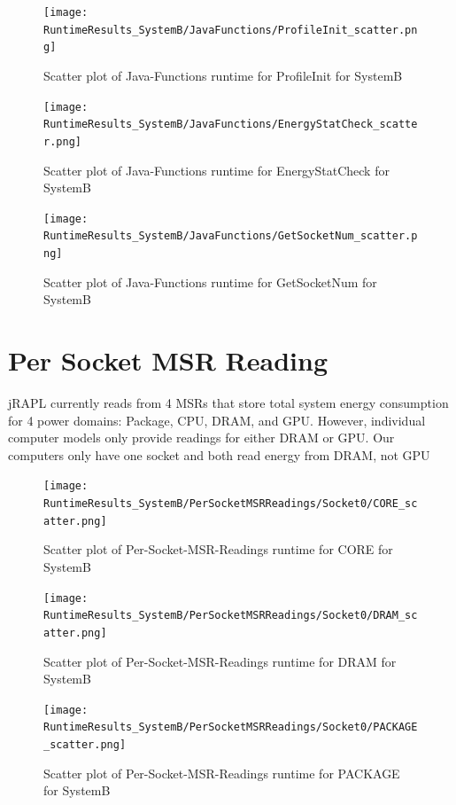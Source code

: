 \documentclass{article}
\begin{document}
\begin{figure}[H]
	\centering
	\texttt{[image: RuntimeResults\_SystemB/JavaFunctions/ProfileInit\_scatter.png]}
	\caption{Scatter plot of Java-Functions runtime for ProfileInit for SystemB}
	\label{fig:Java-Functions|ProfileInit|SystemB}
\end{figure}

\begin{figure}[H]
	\centering
	\texttt{[image: RuntimeResults\_SystemB/JavaFunctions/EnergyStatCheck\_scatter.png]}
	\caption{Scatter plot of Java-Functions runtime for EnergyStatCheck for SystemB}
	\label{fig:Java-Functions|EnergyStatCheck|SystemB}
\end{figure}

\begin{figure}[H]
	\centering
	\texttt{[image: RuntimeResults\_SystemB/JavaFunctions/GetSocketNum\_scatter.png]}
	\caption{Scatter plot of Java-Functions runtime for GetSocketNum for SystemB}
	\label{fig:Java-Functions|GetSocketNum|SystemB}
\end{figure}

\section{Per Socket MSR Reading}
jRAPL currently reads from 4 MSRs that store total system energy consumption for 4 power domains: Package, CPU, DRAM, and GPU. However, individual computer models only provide readings for either DRAM or GPU. Our computers only have one socket and both read energy from DRAM, not GPU

\begin{figure}[H]
	\centering
	\texttt{[image: RuntimeResults\_SystemB/PerSocketMSRReadings/Socket0/CORE\_scatter.png]}
	\caption{Scatter plot of Per-Socket-MSR-Readings runtime for CORE for SystemB}
	\label{fig:Per-Socket-MSR-Readings|CORE|SystemB}
\end{figure}

\begin{figure}[H]
	\centering
	\texttt{[image: RuntimeResults\_SystemB/PerSocketMSRReadings/Socket0/DRAM\_scatter.png]}
	\caption{Scatter plot of Per-Socket-MSR-Readings runtime for DRAM for SystemB}
	\label{fig:Per-Socket-MSR-Readings|DRAM|SystemB}
\end{figure}

\begin{figure}[H]
	\centering
	\texttt{[image: RuntimeResults\_SystemB/PerSocketMSRReadings/Socket0/PACKAGE\_scatter.png]}
	\caption{Scatter plot of Per-Socket-MSR-Readings runtime for PACKAGE for SystemB}
	\label{fig:Per-Socket-MSR-Readings|PACKAGE|SystemB}
\end{figure}
\end{document}
